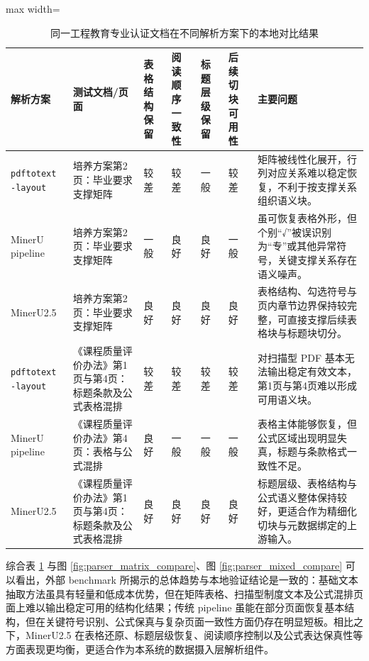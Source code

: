 \documentclass[UTF8,a4paper,zihao=-4]{ctexart}
\begin{document}
\begin{table}[htbp]
\centering
\caption{同一工程教育专业认证文档在不同解析方案下的本地对比结果}
\label{tab:local_parser_compare}
{\small
\renewcommand{\arraystretch}{1.2}
\begin{adjustbox}{max width=\textwidth}
\begin{tabular}{p{1.8cm}p{2.6cm}p{1.6cm}p{1.8cm}p{1.7cm}p{1.9cm}p{3.1cm}}
\toprule
解析方案 & 测试文档/页面 & 表格结构保留 & 阅读顺序一致性 & 标题层级保留 & 后续切块可用性 & 主要问题 \\
\midrule
\texttt{pdftotext -layout} & 培养方案第2页：毕业要求支撑矩阵 & 较差 & 较差 & 一般 & 较差 & 矩阵被线性化展开，行列对应关系难以稳定恢复，不利于按支撑关系组织语义块。 \\
MinerU pipeline & 培养方案第2页：毕业要求支撑矩阵 & 一般 & 良好 & 良好 & 一般 & 虽可恢复表格外形，但个别“√”被误识别为“专”或其他异常符号，关键支撑关系存在语义噪声。 \\
MinerU2.5 & 培养方案第2页：毕业要求支撑矩阵 & 良好 & 良好 & 良好 & 良好 & 表格结构、勾选符号与页内章节边界保持较完整，可直接支撑后续表格块与标题块切分。 \\
\texttt{pdftotext -layout} & 《课程质量评价办法》第1页与第4页：标题条款及公式表格混排 & 较差 & 较差 & 较差 & 较差 & 对扫描型 PDF 基本无法输出稳定有效文本，第1页与第4页难以形成可用语义块。 \\
MinerU pipeline & 《课程质量评价办法》第4页：表格与公式混排 & 良好 & 一般 & 一般 & 一般 & 表格主体能够恢复，但公式区域出现明显失真，标题与条款格式一致性不足。 \\
MinerU2.5 & 《课程质量评价办法》第1页与第4页：标题条款及公式表格混排 & 良好 & 良好 & 良好 & 良好 & 标题层级、表格结构与公式语义整体保持较好，更适合作为精细化切块与元数据绑定的上游输入。 \\
\bottomrule
\end{tabular}
\end{adjustbox}
}
\end{table}

综合表 \ref{tab:local_parser_compare} 与图 \ref{fig:parser_matrix_compare}、图 \ref{fig:parser_mixed_compare} 可以看出，外部 benchmark 所揭示的总体趋势与本地验证结论是一致的：基础文本抽取方法虽具有轻量和低成本优势，但在矩阵表格、扫描型制度文本及公式混排页面上难以输出稳定可用的结构化结果；传统 pipeline 虽能在部分页面恢复基本结构，但在关键符号识别、公式保真与复杂页面一致性方面仍存在明显短板。相比之下，MinerU2.5 在表格还原、标题层级恢复、阅读顺序控制以及公式表达保真性等方面表现更均衡，更适合作为本系统的数据摄入层解析组件。
\end{document}
